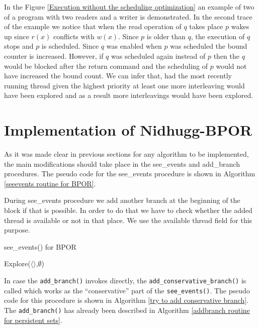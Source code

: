 
In the Figure \ref{Execution without the scheduling optimization} an example of two of a program with two readers and a
writer is demonstrated. In the second trace of the example we notice that when the read operation of $q$ takes place $p$
wakes up since $r(x)$ conflicts with $w(x)$. Since $p$ is older than $q$, the execution of $q$ stops and $p$ is
scheduled. Since $q$ was enabled when $p$ was scheduled the bound counter is increased. However, if $q$ was scheduled
again instead of $p$ then the $q$ would be blocked after the return command and the scheduling of $p$ would not have
increased the bound count. We can infer that, had the most recently running thread given the highest priority at least
one more interleaving would have been explored and as a result more interleavings would have been explored.

\section{Implementation of Nidhugg-BPOR}

As it was made clear in previous sections for any algorithm to be implemented, the main modifications should take place
in the see\_events and add\_branch procedures. The pseudo code for the see\_events procedure is shown in Algorithm
\ref{seeevents routine for BPOR}.

During see\_events procedure we add another branch at the beginning of the block if that is possible. In order to do
that we have to check whether the added thread is available or not in that place. We use the available thread field for
this purpose.

\begin{algorithm}[H]
    \caption{see\_events() for BPOR}
    \label{seeevents routine for BPOR}
    Explore($\langle \rangle$,$\emptyset$)\;
\end{algorithm}

In case the \verb|add_branch()| invokes directly, the \verb|add_conservative_branch()| is called which works as the ``conservative''
part of the \verb|see_events()|. The pseudo code for this procedure is shown in Algorithm \ref{try to add conservative branch}.
The \verb|add_branch()| has already been described in Algorithm \ref{addbranch routine for persistent sets}.

